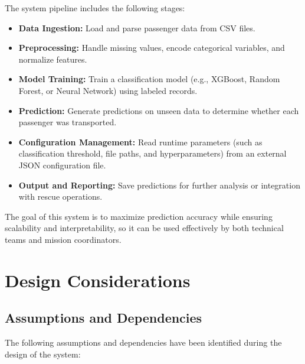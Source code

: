 \documentclass[15pt]{article}
\begin{document}
The system pipeline includes the following stages:
\begin{itemize}
    \item \textbf{Data Ingestion:} Load and parse passenger data from CSV files.
    \item \textbf{Preprocessing:} Handle missing values, encode categorical variables, and normalize features.
    \item \textbf{Model Training:} Train a classification model (e.g., XGBoost, Random Forest, or Neural Network) using labeled records.
    \item \textbf{Prediction:} Generate predictions on unseen data to determine whether each passenger was transported.
    \item \textbf{Configuration Management:} Read runtime parameters (such as classification threshold, file paths, and hyperparameters) from an external JSON configuration file.
    \item \textbf{Output and Reporting:} Save predictions for further analysis or integration with rescue operations.
\end{itemize}

The goal of this system is to maximize prediction accuracy while ensuring scalability and interpretability, so it can be used effectively by both technical teams and mission coordinators.

\section{Design Considerations}
\subsection{Assumptions and Dependencies}
The following assumptions and dependencies have been identified during the design of the system:
\end{document}
